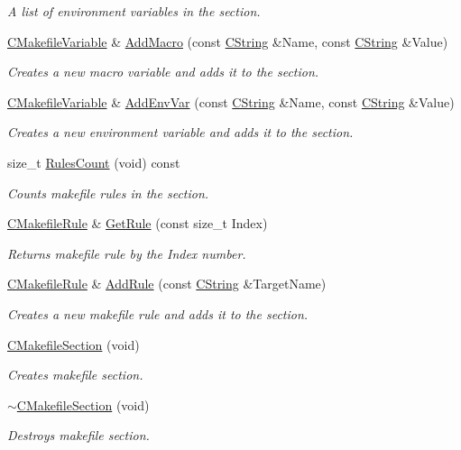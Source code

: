 \begin{DoxyCompactItemize}
\begin{DoxyCompactList}\small\item\em A list of environment variables in the section. \end{DoxyCompactList}\item 
\hyperlink{classCMakefileVariable}{C\-Makefile\-Variable} \& \hyperlink{classCMakefileSection_ac106969cabae16d8475a1e36f02672c8}{Add\-Macro} (const \hyperlink{classCString}{C\-String} \&Name, const \hyperlink{classCString}{C\-String} \&Value)
\begin{DoxyCompactList}\small\item\em Creates a new macro variable and adds it to the section. \end{DoxyCompactList}\item 
\hyperlink{classCMakefileVariable}{C\-Makefile\-Variable} \& \hyperlink{classCMakefileSection_aa6ef8789a7f3906925ffc5d727c431f3}{Add\-Env\-Var} (const \hyperlink{classCString}{C\-String} \&Name, const \hyperlink{classCString}{C\-String} \&Value)
\begin{DoxyCompactList}\small\item\em Creates a new environment variable and adds it to the section. \end{DoxyCompactList}\item 
size\-\_\-t \hyperlink{classCMakefileSection_aa1fe2aca8d228bdaf3b58ec6c9960153}{Rules\-Count} (void) const 
\begin{DoxyCompactList}\small\item\em Counts makefile rules in the section. \end{DoxyCompactList}\item 
\hyperlink{classCMakefileRule}{C\-Makefile\-Rule} \& \hyperlink{classCMakefileSection_a2bb0288892998d8fef244fc7577603bd}{Get\-Rule} (const size\-\_\-t Index)
\begin{DoxyCompactList}\small\item\em Returns makefile rule by the {\itshape Index} number. \end{DoxyCompactList}\item 
\hyperlink{classCMakefileRule}{C\-Makefile\-Rule} \& \hyperlink{classCMakefileSection_a67bd40db35403fb5e1977fed432ec8ff}{Add\-Rule} (const \hyperlink{classCString}{C\-String} \&Target\-Name)
\begin{DoxyCompactList}\small\item\em Creates a new makefile rule and adds it to the section. \end{DoxyCompactList}\item 
\hyperlink{classCMakefileSection_a2669d3e48d1bc78ef8a72c792d52af7e}{C\-Makefile\-Section} (void)
\begin{DoxyCompactList}\small\item\em Creates makefile section. \end{DoxyCompactList}\item 
\hyperlink{classCMakefileSection_ac8ed9b94580dba116e989a6274981288}{$\sim$\-C\-Makefile\-Section} (void)
\begin{DoxyCompactList}\small\item\em Destroys makefile section. \end{DoxyCompactList}\end{DoxyCompactItemize}
